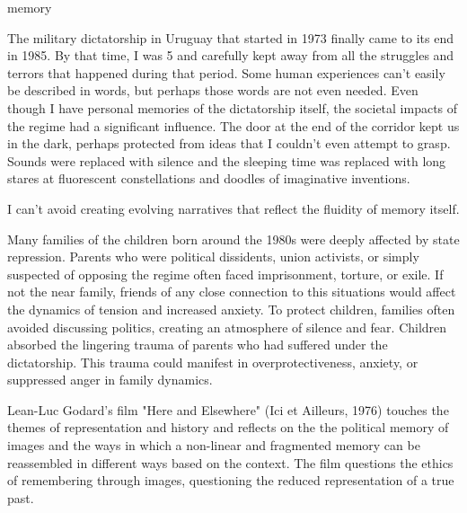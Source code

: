 \begin{center}
\Huge memory
\vspace{2cm}
\begin{flushright}
\large
\end{flushright}
\vspace{2cm}
\end{center}
\normalsize

The military dictatorship in Uruguay that started in 1973 finally came to its end in 1985. By that time, I was 5 and carefully kept away from all the struggles and terrors that happened during that period. Some human experiences can't easily be described in words, but perhaps those words are not even needed. Even though I have personal memories of the dictatorship itself, the societal impacts of the regime had a significant influence. The door at the end of the corridor kept us in the dark, perhaps protected from ideas that I couldn't even attempt to grasp. Sounds were replaced with silence and the sleeping time was replaced with long stares at fluorescent constellations and doodles of imaginative inventions.    

I can't avoid creating evolving narratives that reflect the fluidity of memory itself. 

Many families of the children born around the 1980s were deeply affected by state repression. Parents who were political dissidents, union activists, or simply suspected of opposing the regime often faced imprisonment, torture, or exile. If not the near family, friends of any close connection to this situations would affect the dynamics of tension and increased anxiety. To protect children, families often avoided discussing politics, creating an atmosphere of silence and fear. Children absorbed the lingering trauma of parents who had suffered under the dictatorship. This trauma could manifest in overprotectiveness, anxiety, or suppressed anger in family dynamics.

Lean-Luc Godard’s film "Here and Elsewhere" (Ici et Ailleurs, 1976) touches the themes of representation and history and reflects on the the political memory of images and the ways in which a non-linear and fragmented memory can be reassembled in different ways based on the context. The film questions the ethics of remembering through images, questioning the reduced representation of a true past. 

